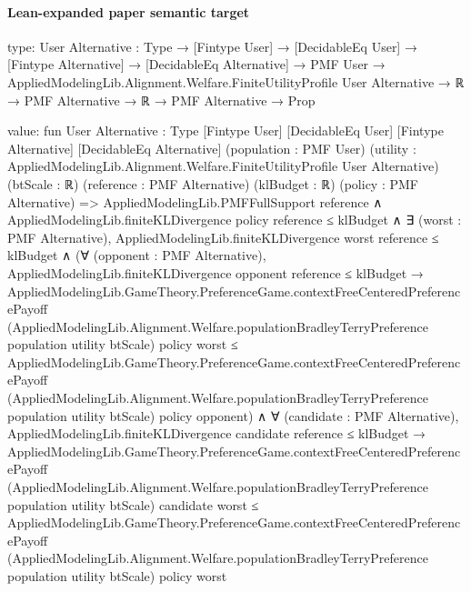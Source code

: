 \documentclass[10pt]{article}
\begin{document}
\paragraph{Lean-expanded paper semantic target}
\begin{ReviewVerbatim}
type:
{User Alternative : Type} →
  [Fintype User] →
    [DecidableEq User] →
      [Fintype Alternative] →
        [DecidableEq Alternative] →
          PMF User →
            AppliedModelingLib.Alignment.Welfare.FiniteUtilityProfile User Alternative →
              ℝ → PMF Alternative → ℝ → PMF Alternative → Prop

value:
fun {User Alternative : Type} [Fintype User] [DecidableEq User] [Fintype Alternative] [DecidableEq Alternative]
    (population : PMF User) (utility : AppliedModelingLib.Alignment.Welfare.FiniteUtilityProfile User Alternative)
    (btScale : ℝ) (reference : PMF Alternative) (klBudget : ℝ) (policy : PMF Alternative) =>
  AppliedModelingLib.PMFFullSupport reference ∧
    AppliedModelingLib.finiteKLDivergence policy reference ≤ klBudget ∧
      ∃ (worst : PMF Alternative),
        AppliedModelingLib.finiteKLDivergence worst reference ≤ klBudget ∧
          (∀ (opponent : PMF Alternative),
              AppliedModelingLib.finiteKLDivergence opponent reference ≤ klBudget →
                AppliedModelingLib.GameTheory.PreferenceGame.contextFreeCenteredPreferencePayoff
                    (AppliedModelingLib.Alignment.Welfare.populationBradleyTerryPreference population utility btScale)
                    policy worst ≤
                  AppliedModelingLib.GameTheory.PreferenceGame.contextFreeCenteredPreferencePayoff
                    (AppliedModelingLib.Alignment.Welfare.populationBradleyTerryPreference population utility btScale)
                    policy opponent) ∧
            ∀ (candidate : PMF Alternative),
              AppliedModelingLib.finiteKLDivergence candidate reference ≤ klBudget →
                AppliedModelingLib.GameTheory.PreferenceGame.contextFreeCenteredPreferencePayoff
                    (AppliedModelingLib.Alignment.Welfare.populationBradleyTerryPreference population utility btScale)
                    candidate worst ≤
                  AppliedModelingLib.GameTheory.PreferenceGame.contextFreeCenteredPreferencePayoff
                    (AppliedModelingLib.Alignment.Welfare.populationBradleyTerryPreference population utility btScale)
                    policy worst
\end{ReviewVerbatim}
\end{document}
